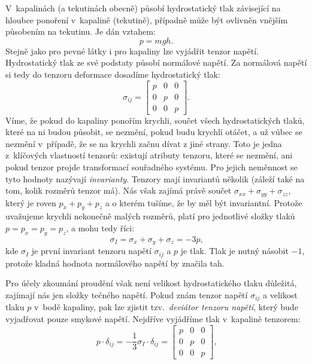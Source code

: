 \documentclass[12pt]{article}
\begin{document}
V~kapalinách (a tekutinách obecně) působí hydrostatický tlak závisející na hloubce ponoření v~kapalině (tekutině), případně může být ovlivněn vnějším působením na tekutinu. Je dán vztahem:
\begin{equation}
    p = mgh\text{.}
\end{equation}
Stejně jako pro pevné látky i pro kapaliny lze vyjádřit tenzor napětí. Hydrostatický tlak ze své podstaty působí normálové napětí. Za normálová napětí si tedy do tenzoru deformace dosadíme hydrostatický tlak:
\begin{equation}
    \sigma_{ij} = 
    \begin{bmatrix}
        p & 0 & 0\\
        0 & p & 0\\
        0 & 0 & p
    \end{bmatrix}
    \text{.}
\end{equation}
Víme, že pokud do kapaliny ponořím krychli, součet všech hydrostatických tlaků, které na ni budou působit, se nezmění, pokud budu krychlí otáčet, a už vůbec se nezmění v~případě, že se na krychli začnu dívat z jiné strany. Toto je jedna z~klíčových vlastností tenzorů: existují atributy tenzoru, které se nezmění, ani pokud tenzor projde transformací souřadného systému. Pro jejich neměnnost se tyto hodnoty nazývají \emph{invarianty}. Tenzory mají invariantů několik (záleží také na tom, kolik rozměrů tenzor má). Nás však zajímá právě součet $\sigma_{xx} + \sigma_{yy} + \sigma_{zz}$, který je roven $p_x + p_y + p_z$ a o kterém tušíme, že by měl být invariantní. Protože uvažujeme krychli nekonečně malých rozměrů, platí pro jednotlivé složky tlaků $p = p_x = p_y = p_z$, a mohu tedy říci:
\begin{equation}
    \sigma_I = \sigma_x + \sigma_y + \sigma_z = -3p\text{,}
\end{equation}
kde $\sigma_I$ je první invariant tenzoru napětí $\sigma_{ij}$ a $p$ je tlak. Tlak je nutný násobit $-1$, protože kladná hodnota normálového napětí by značila tah.
\par \noindent
Pro účely zkoumání proudění však není velikost hydrostatického tlaku důležitá, zajímají nás jen složky tečného napětí. Pokud znám tenzor napětí $\sigma_{ij}$ a velikost tlaku $p$ v~bodě kapaliny, pak lze zjistit tzv.~\emph{deviátor tenzoru napětí}, který bude vyjadřovat pouze smykové napětí. Nejdříve vyjádříme tlak v~kapalině tenzorem:
\begin{equation}
    p\cdot\delta_{ij} = -\frac{1}{3}\sigma_I\cdot\delta_{ij} =
    \begin{bmatrix}
        p & 0 & 0\\
        0 & p & 0\\
        0 & 0 & p
    \end{bmatrix}
    \text{,}
\end{equation}
\end{document}
